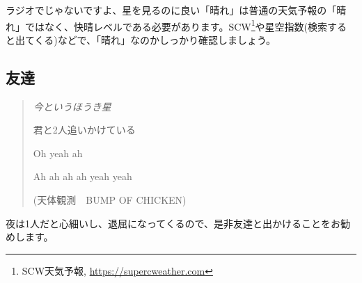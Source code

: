 \documentclass[../../super_nova_2024]{subfiles}
\begin{document}
ラジオでじゃないですよ、星を見るのに良い「晴れ」は普通の天気予報の「晴れ」ではなく、快晴レベルである必要があります。SCW\footnote{SCW天気予報, \url{https://supercweather.com}}や星空指数(検索すると出てくる)などで、「晴れ」なのかしっかり確認しましょう。


\subsection{友達}
\begin{verse}
  {\slshape
  今というほうき星

  君と2人追いかけている

  Oh yeah ah

  Ah ah ah ah yeah yeah

  }
  {\footnotesize(天体観測　BUMP OF CHICKEN)}
\end{verse}

夜は1人だと心細いし、退屈になってくるので、是非友達と出かけることをお勧めします。
\end{document}
